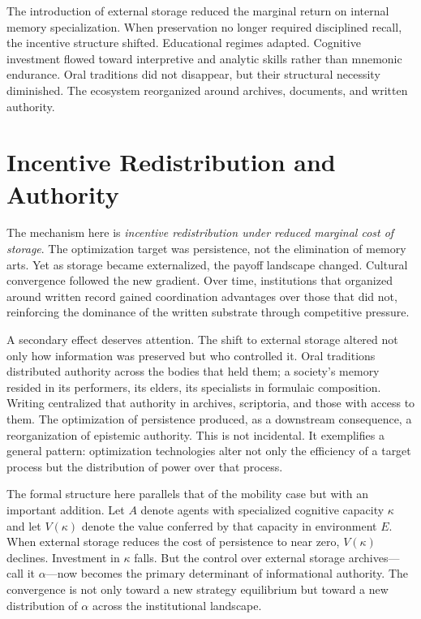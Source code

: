 \documentclass[12pt, oneside]{book}
\theoremstyle{plain}
\theoremstyle{definition}
\theoremstyle{remark}
\theoremstyle{definition}
\begin{document}
The introduction of external storage reduced the marginal return on internal memory
specialization. When preservation no longer required disciplined recall, the incentive
structure shifted. Educational regimes adapted. Cognitive investment flowed toward
interpretive and analytic skills rather than mnemonic endurance. Oral traditions did
not disappear, but their structural necessity diminished. The ecosystem reorganized
around archives, documents, and written authority.

\section{Incentive Redistribution and Authority}

The mechanism here is \emph{incentive redistribution under reduced marginal cost of
storage}. The optimization target was persistence, not the elimination of memory arts.
Yet as storage became externalized, the payoff landscape changed. Cultural convergence
followed the new gradient. Over time, institutions that organized around written record
gained coordination advantages over those that did not, reinforcing the dominance of
the written substrate through competitive pressure.

A secondary effect deserves attention. The shift to external storage altered not only
how information was preserved but who controlled it. Oral traditions distributed
authority across the bodies that held them; a society's memory resided in its
performers, its elders, its specialists in formulaic composition. Writing centralized
that authority in archives, scriptoria, and those with access to them. The optimization
of persistence produced, as a downstream consequence, a reorganization of epistemic
authority. This is not incidental. It exemplifies a general pattern: optimization
technologies alter not only the efficiency of a target process but the distribution
of power over that process.

The formal structure here parallels that of the mobility case but with an important
addition. Let $A$ denote agents with specialized cognitive capacity $\kappa$ and let
$V(\kappa)$ denote the value conferred by that capacity in environment $E$. When
external storage reduces the cost of persistence to near zero, $V(\kappa)$ declines.
Investment in $\kappa$ falls. But the control over external storage archives---call it
$\alpha$---now becomes the primary determinant of informational authority. The
convergence is not only toward a new strategy equilibrium but toward a new distribution
of $\alpha$ across the institutional landscape.
\end{document}
